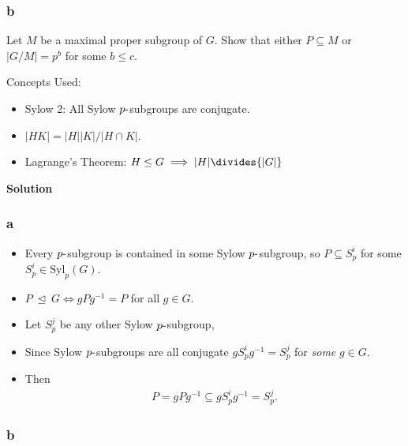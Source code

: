 \hypertarget{b-10}{%
\subsubsection{b}\label{b-10}}

Let \(M\) be a maximal proper subgroup of \(G\). Show that either
\(P \subseteq M\) or \(|G/M | = p^b\) for some \(b \leq c\).

\begin{solution}

Concepts Used:

\begin{itemize}
\tightlist
\item
  Sylow 2: All Sylow \(p{\hbox{-}}\)subgroups are conjugate.
\item
  \({\left\lvert {HK} \right\rvert} = {\left\lvert {H} \right\rvert} {\left\lvert {K} \right\rvert} / {\left\lvert {H\cap K} \right\rvert}\).
\item
  Lagrange's Theorem:
  \(H\leq G \implies {\left\lvert {H} \right\rvert} \divides {\left\lvert {G} \right\rvert}\)
\end{itemize}

\textbf{Solution}

\hypertarget{a-11}{%
\subsubsection{a}\label{a-11}}

\begin{itemize}
\item
  Every \(p{\hbox{-}}\)subgroup is contained in some Sylow
  \(p{\hbox{-}}\)subgroup, so \(P \subseteq S_p^i\) for some
  \(S_p^i \in \mathrm{Syl}_p(G)\).
\item
  \(P {~\trianglelefteq~}G \iff gPg^{-1}= P\) for all \(g\in G\).
\item
  Let \(S_p^j\) be any other Sylow \(p{\hbox{-}}\)subgroup,
\item
  Since Sylow \(p{\hbox{-}}\)subgroups are all conjugate
  \(gS_p^i g^{-1}= S_p^j\) for \emph{some} \(g\in G\).
\item
  Then
  \begin{align*}
  P = gPg^{-1}\subseteq gS_p^i g^{-1}= S_p^j
  .\end{align*}
\end{itemize}

\hypertarget{b-11}{%
\subsubsection{b}\label{b-11}}


\end{solution}
